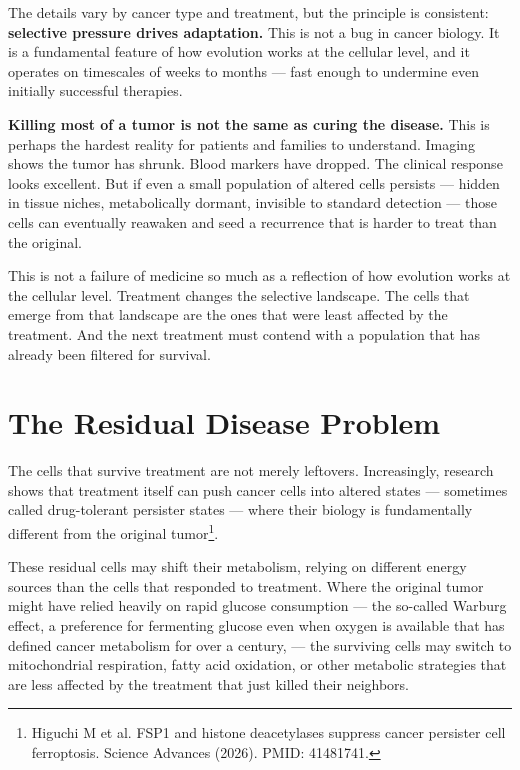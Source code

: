 \documentclass[11pt,twoside,openright]{report}
\begin{document}
The details vary by cancer type and treatment, but the principle is consistent: \textbf{selective pressure drives adaptation.} This is not a bug in cancer biology. It is a fundamental feature of how evolution works at the cellular level, and it operates on timescales of weeks to months --- fast enough to undermine even initially successful therapies.

\textbf{Killing most of a tumor is not the same as curing the disease.} This is perhaps the hardest reality for patients and families to understand. Imaging shows the tumor has shrunk. Blood markers have dropped. The clinical response looks excellent. But if even a small population of altered cells persists --- hidden in tissue niches, metabolically dormant, invisible to standard detection --- those cells can eventually reawaken and seed a recurrence that is harder to treat than the original.

This is not a failure of medicine so much as a reflection of how evolution works at the cellular level. Treatment changes the selective landscape. The cells that emerge from that landscape are the ones that were least affected by the treatment. And the next treatment must contend with a population that has already been filtered for survival.

\section{The Residual Disease Problem}

The cells that survive treatment are not merely leftovers. Increasingly, research shows that treatment itself can push cancer cells into altered states --- sometimes called drug-tolerant persister states --- where their biology is fundamentally different from the original tumor\footnote{Higuchi M et al. FSP1 and histone deacetylases suppress cancer persister cell ferroptosis. Science Advances (2026). PMID: 41481741.}.

These residual cells may shift their metabolism, relying on different energy sources than the cells that responded to treatment. Where the original tumor might have relied heavily on rapid glucose consumption --- the so-called Warburg effect, a preference for fermenting glucose even when oxygen is available that has defined cancer metabolism for over a century, --- the surviving cells may switch to mitochondrial respiration, fatty acid oxidation, or other metabolic strategies that are less affected by the treatment that just killed their neighbors.
\end{document}

